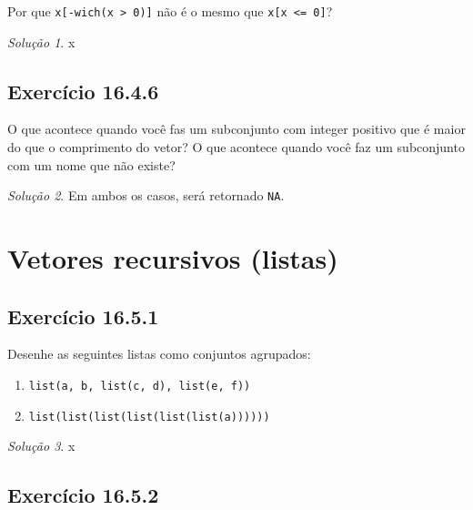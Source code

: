 \documentclass[
]{latex/krantz}
\providecommand{\tightlist}{%
  \setlength{\itemsep}{0pt}\setlength{\parskip}{0pt}}
\theoremstyle{definition}
\theoremstyle{definition}
\theoremstyle{definition}
\theoremstyle{definition}
\theoremstyle{remark}
\newtheorem*{solution}{Solução}
\begin{document}
Por que \texttt{x{[}-wich(x\ \textgreater{}\ 0){]}} não é o mesmo que \texttt{x{[}x\ \textless{}=\ 0{]}}?

\begin{solution}
x
\end{solution}

\hypertarget{exr16-4-6}{%
\subsection*{Exercício 16.4.6}\label{exr16-4-6}}

O que acontece quando você fas um subconjunto com integer positivo que é maior do que o comprimento do vetor? O que acontece quando você faz um subconjunto com um nome que não existe?

\begin{solution}
Em ambos os casos, será retornado \texttt{NA}.
\end{solution}

\hypertarget{vetores-recursivos-listas}{%
\section{Vetores recursivos (listas)}\label{vetores-recursivos-listas}}

\hypertarget{exr16-5-1}{%
\subsection*{Exercício 16.5.1}\label{exr16-5-1}}

Desenhe as seguintes listas como conjuntos agrupados:

\begin{enumerate}
\def\labelenumi{\alph{enumi}.}
\tightlist
\item
  \texttt{list(a,\ b,\ list(c,\ d),\ list(e,\ f))}
\item
  \texttt{list(list(list(list(list(list(a))))))}
\end{enumerate}

\begin{solution}
x
\end{solution}

\hypertarget{exr16-5-2}{%
\subsection*{Exercício 16.5.2}\label{exr16-5-2}}
\end{document}
